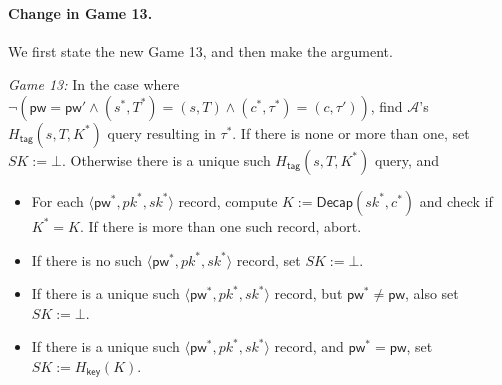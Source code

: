 \documentclass{article}
\theoremstyle{plain}
\theoremstyle{definition}
\theoremstyle{remark}
\newcommand{\adv}{\mathcal{A}}
\newcommand{\Decap}{\mathsf{Decap}}
\newcommand{\Hkey}{H_\mathsf{key}}
\newcommand{\Htag}{H_\mathsf{tag}}
\newcommand{\pw}{\mathsf{pw}}
\begin{document}
\paragraph{Change in Game 13.}
We first state the new Game 13, and then make the argument.

\medskip\noindent\emph{Game 13:} In the case where $\neg(\pw = \pw' \land (s^*,T^*) = (s,T) \land (c^*,\tau^*) = (c,\tau'))$, find $\adv$'s $\Htag(s,T,K^*)$ query resulting in $\tau^*$. If there is none or more than one, set $SK := \bot$. Otherwise there is a unique such $\Htag(s,T,K^*)$ query, and
\begin{itemize}
  \item For each $\langle\pw^*,pk^*,sk^*\rangle$ record, compute $K := \Decap(sk^*,c^*)$ and check if $K^* = K$. If there is more than one such record, abort.
  \item If there is no such $\langle\pw^*,pk^*,sk^*\rangle$ record, set $SK := \bot$.
  \item If there is a unique such $\langle\pw^*,pk^*,sk^*\rangle$ record, but $\pw^* \neq \pw$, also set $SK := \bot$.
  \item If there is a unique such $\langle\pw^*,pk^*,sk^*\rangle$ record, and $\pw^* = \pw$, set $SK := \Hkey(K)$.
\end{itemize}
\end{document}
